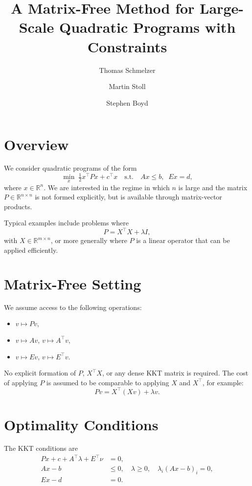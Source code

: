 \documentclass[11pt]{article}
\title{A Matrix-Free Method for Large-Scale Quadratic Programs with Constraints}
\author{Thomas Schmelzer \and Martin Stoll \and Stephen Boyd}
\date{}
\begin{document}
\maketitle

\section{Overview}

We consider quadratic programs of the form
\[
\min_x \; \tfrac{1}{2} x^\top P x + c^\top x \quad \text{s.t.} \quad A x \le b,\;\; E x = d,
\]
where \(x \in \mathbb{R}^n\). We are interested in the regime in which \(n\) is large and the matrix \(P \in \mathbb{R}^{n \times n}\) is
not formed explicitly, but is available through matrix-vector products.

Typical examples include problems where
\[
P = X^\top X + \lambda I,
\]
with \(X \in \mathbb{R}^{m \times n}\), or more generally where \(P\) is a linear operator that can be applied efficiently.

\section{Matrix-Free Setting}

We assume access to the following operations:
\begin{itemize}
\item \(v \mapsto P v\),
\item \(v \mapsto A v\), \(v \mapsto A^\top v\),
\item \(v \mapsto E v\), \(v \mapsto E^\top v\).
\end{itemize}

No explicit formation of \(P\), \(X^\top X\), or any dense KKT matrix is required. The cost of applying \(P\) is assumed to be comparable to applying \(X\) and \(X^\top\), for example:
\[
P v = X^\top (X v) + \lambda v.
\]

\section{Optimality Conditions}

The KKT conditions are
\[
\begin{aligned}
P x + c + A^\top \lambda + E^\top \nu &= 0, \\
A x - b &\le 0,\quad \lambda \ge 0,\quad \lambda_i (A x - b)_i = 0, \\
E x - d &= 0.
\end{aligned}
\]
\end{document}
